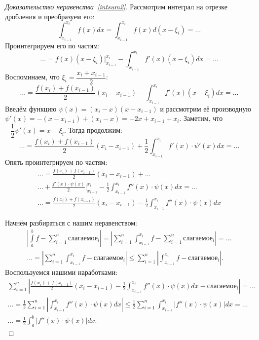 \begin{proof}[Доказательство неравенства~\eqref{intsum2}]
	Рассмотрим интеграл на отрезке дробления и преобразуем его: \[
		\int_{x_{i - 1}}^{x_i} f(x) dx = \int_{x_{i - 1}}^{x_i} f(x) d(x - \xi_i) = \ldots
	\]
	Проинтегрируем его по частям: \[
		\ldots = f(x) (x - \xi_i) \bigg|_{x_{i - 1}}^{x_i} - \int_{x_{i - 1}}^{x_i} f'(x) (x - \xi_i) dx = \ldots
	\]
	Воспоминаем, что \(\xi_i = \dfrac{x_i + x_{i - 1}}{2}\): \[
		\ldots = \frac{f(x_i) + f(x_{i - 1})}{2} (x_i - x_{i - 1}) - \int_{x_{i - 1}}^{x_i} f'(x) (x - \xi_i) dx = \ldots
	\]
	Введём функцию \(\psi(x) = (x_i - x) (x - x_{i - 1})\) и рассмотрим её производную \(\psi'(x) = -(x - x_{i - 1}) + (x_i - x) = -2x + x_{i - 1} + x_i\). Заметим, что \(-\dfrac{1}{2} \psi'(x) = x - \xi_i\). Тогда продолжим: \[
		\ldots = \frac{f(x_i) + f(x_{i - 1})}{2} (x_i - x_{i - 1}) + \frac12 \int_{x_{i - 1}}^{x_i} f'(x) \cdot \psi'(x) dx = \ldots
	\]
	Опять проинтегрируем по частям:
	\begin{gather*}
		\ldots = \frac{f(x_i) + f(x_{i - 1})}{2} (x_i - x_{i - 1}) + \ldots \\
		\ldots + \frac{f'(x) \cdot \psi(x)}{2} \bigg|_{x_{i - 1}}^{x_i} - \frac{1}{2}\int_{x_{i - 1}}^{x_i} f''(x) \cdot \psi(x) dx = \ldots \\
		\ldots = \frac{f(x_i) + f(x_{i - 1})}{2} (x_i - x_{i - 1}) - \frac{1}{2}\int_{x_{i - 1}}^{x_i} f''(x) \cdot \psi(x) dx
	\end{gather*}
	
	Начнём разбираться с нашим неравенством:
	\begin{gather*}
		\left|\int\limits_a^b f - \sum_{i = 1}^n \textit{слагаемое}_i \right| = \left|\sum_{i = 1}^n \int_{x_{i - 1}}^{x_i} f - \sum_{i = 1}^n \textit{слагаемое}_i \right| = \ldots \\
		\ldots = \left|\sum_{i = 1}^n \int_{x_{i - 1}}^{x_i} f - \textit{слагаемое}_i \right| \leqslant \sum_{i = 1}^n \left|\int_{x_{i - 1}}^{x_i} f - \textit{слагаемое}_i \right|.
	\end{gather*}
	Воспользуемся нашими наработками:
	\begin{gather*}
		\sum_{i = 1}^n \left|\frac{f(x_i) + f(x_{i - 1})}{2} (x_i - x_{i - 1}) - \frac{1}{2}\int_{x_{i - 1}}^{x_i} f''(x) \cdot \psi(x) dx - \textit{слагаемое}_i \right| = \ldots \\
		\ldots = \frac{1}{2} \sum_{i = 1}^n \left|\int_{x_{i - 1}}^{x_i} f''(x) \cdot \psi(x) dx \right| \leqslant \frac{1}{2} \sum_{i = 1}^n \int_{x_{i - 1}}^{x_i} \left|f''(x) \cdot \psi(x) \right| dx = \ldots \\
		\ldots = \frac{1}{2} \int_a^b \left|f''(x) \cdot \psi(x) \right| dx.
	\end{gather*}
	

\end{proof}
